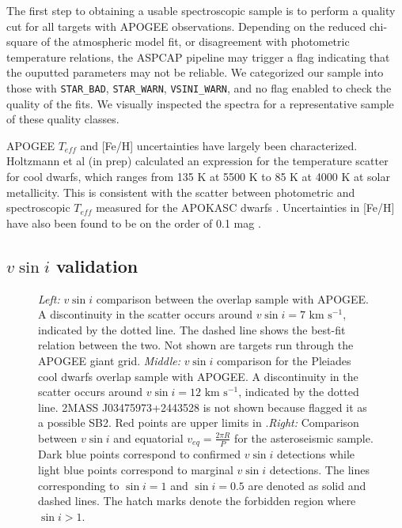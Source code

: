 \documentclass[manuscript]{aastex6}
\newcommand{\vsini}{\ensuremath{v \sin i}}
\newcommand{\Teff}{\ensuremath{T_{eff}}}
\newcommand{\kms}{\textrm{~km~s}\ensuremath{^{-1}}}
\newcommand{\STARBAD}{\texttt{STAR\_BAD}}
\newcommand{\STARWARN}{\texttt{STAR\_WARN}}
\newcommand{\VSINIWARN}{\texttt{VSINI\_WARN}}
\newcommand{\gvs}{\authorcomment1}
\begin{document}
The first step to obtaining a usable spectroscopic sample is to perform a 
quality cut for all targets with APOGEE observations.
Depending on the reduced chi-square of the atmospheric model fit, or
disagreement with photometric temperature relations, the ASPCAP pipeline
may trigger a flag indicating that the ouputted parameters may not be
reliable. We categorized our sample into those with \STARBAD, \STARWARN,
\VSINIWARN{}, and no flag enabled to check the quality of the fits. We
visually inspected the spectra for a representative sample of these
quality classes. 

APOGEE \Teff{} and [Fe/H] uncertainties have largely been characterized.
Holtzmann et al (in prep) calculated an expression for the temperature scatter
for cool dwarfs, which ranges from 135 K at 5500 K to 85 K at 4000 K at solar
metallicity. This is consistent with the scatter between photometric and
spectroscopic \Teff{} measured for the APOKASC dwarfs \citep{Serenelli17}.
Uncertainties in [Fe/H] have also been found to be on the order of 0.1 mag
\citep{Serenelli17}. \gvs{Can also try cross-checking with CKS.}

\subsection{\vsini{} validation}
\label{sec:vsini_check}

\begin{figure*}
    \caption{\emph{Left:} \vsini{} comparison between the \citet{Bruntt12}
        overlap sample with APOGEE\@. A discontinuity in the scatter occurs
        around \(\vsini = 7 \kms\), indicated by the dotted line. The dashed
    line shows the best-fit relation between the two. Not shown are targets 
    run through the APOGEE giant grid. \emph{Middle:} \vsini{} comparison for 
    the Pleiades cool dwarfs \citep{Stauffer87} overlap sample with APOGEE\@. 
    A discontinuity in the scatter occurs around \(\vsini = 12 \kms\), 
    indicated by the dotted line. 2MASS J03475973+2443528 is not shown
    because \citet{Stauffer87} flagged it as a possible SB2. Red points are 
    upper limits in \citet{Stauffer87}.\emph{Right:} Comparison between
    \vsini{} and equatorial \(v_{eq} = \frac{2\pi R}{P}\) for the 
    asteroseismic sample. Dark blue points correspond to confirmed
    \vsini{} detections while light blue points correspond to marginal
    \vsini{} detections. The lines corresponding to \(\sin i = 1\) and
    \(\sin i = 0.5\) are denoted as solid and dashed lines. The hatch
    marks denote the forbidden region where \(\sin i > 1\).\label{fig:comps}}
\end{figure*}
\end{document}
